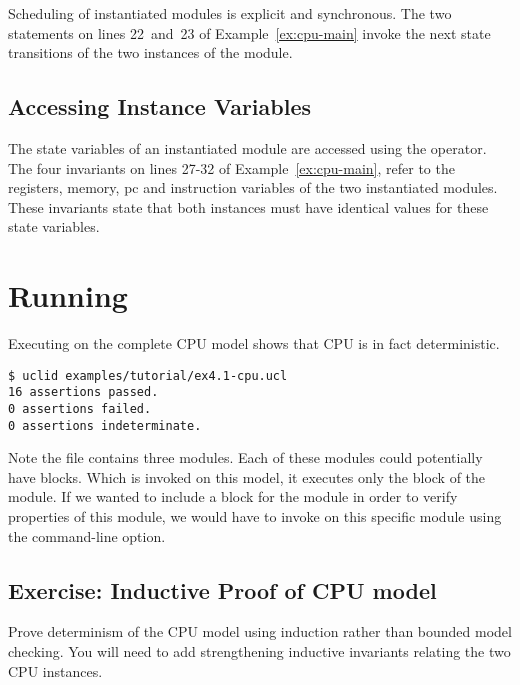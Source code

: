 Scheduling of instantiated modules is explicit and synchronous. The two  statements on lines 22~and~23 of Example~\ref{ex:cpu-main} invoke the next state transitions of the two instances of the  module.

\subsection{Accessing Instance Variables}
The state variables of an instantiated module are accessed using the \codelike{->} operator. The four invariants on lines 27-32 of Example~\ref{ex:cpu-main}, refer to the registers, memory, pc and instruction variables of the two instantiated modules. These invariants state that both instances must have identical values for these state variables.


\section{Running \uclid{}}

Executing \uclid{} on the complete CPU model shows that CPU is in fact deterministic. 

\begin{Verbatim}[frame=single, samepage=true]
$ uclid examples/tutorial/ex4.1-cpu.ucl 
16 assertions passed.
0 assertions failed.
0 assertions indeterminate.
\end{Verbatim}

Note the file  contains three modules. Each of these modules could potentially have  blocks. Which \uclid{} is invoked on this model, it executes only the  block of the  module.  If we wanted to include a  block for the  module in order to verify properties of this module, we would have to invoke \uclid{} on this specific module using the  command-line option.

\subsection{Exercise: Inductive Proof of CPU model}
Prove determinism of the CPU model using induction rather than bounded model checking. You will need to add strengthening inductive invariants relating the two CPU instances.

